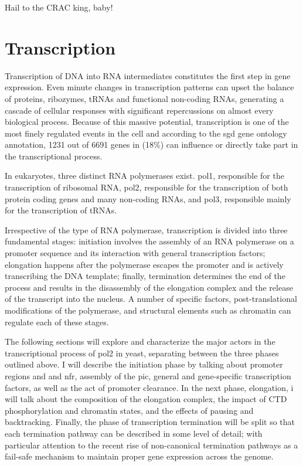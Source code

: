 \begin{savequote}[70mm]
Hail to the CRAC king, baby!
\end{savequote}

\chapter{Transcription}

Transcription of DNA into RNA intermediates constitutes the first step in gene expression.
Even minute changes in transcription patterns can upset the balance of proteins, ribozymes, tRNAs and functional non-coding RNAs, generating a cascade of cellular responses with  significant repercussions on almost every biological process.
Because of this massive potential, transcription is one of the most finely regulated events in the cell and according to the \gls{sgd} \cite{cherry:2012:saccharomyces} gene ontology annotation, 1231 out of 6691 genes in \cer (18\%) can influence or directly take part in the transcriptional process.

In eukaryotes, three distinct RNA polymerases exist. \gls{pol1}, responsible for the transcription of ribosomal RNA, \gls{pol2}, responsible for the transcription of both protein coding genes and many non-coding RNAs, and \gls{pol3}, responsible mainly for the transcription of tRNAs. 

Irrespective of the type of RNA polymerase, transcription is divided into three fundamental stages: initiation involves the assembly of an RNA polymerase on a promoter sequence and its interaction with general transcription factors; elongation happens after the polymerase escapes the promoter and is actively transcribing the DNA template; finally, termination determines the end of the process and results in the disassembly of the elongation complex and the release of the transcript into the nucleus. 
A number of specific factors, post-translational modifications of the polymerase, and structural elements such as chromatin can regulate each of these stages.

The following sections will explore and characterize the major actors in the transcriptional process of \gls{pol2} in yeast, separating between the three phases outlined above.
I will describe the initiation phase by talking about promoter regions and and \gls{nfr}, assembly of the \gls{pic}, general and gene-specific transcription factors, as well as the act of promoter clearance.
In the next phase, elongation, i will talk about the composition of the elongation complex, the impact of CTD phosphorylation and chromatin states, and the effects of pausing and backtracking.
Finally, the phase of transcription termination will be split so that each termination pathway can be described in some level of detail; with particular attention to the recent rise of non-canonical termination pathways as a fail-safe mechanism to maintain proper gene expression across the genome.   

